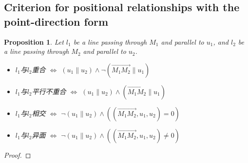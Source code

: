 \documentclass[onecolumn]{ctexart}
\newtheorem{proposition}{Proposition}
\begin{document}
\subsection{Criterion for positional relationships with the point-direction form}
\begin{proposition}
  Let $l_1$ be a line passing through $M_1$ and parallel to $u_1$, and $l_2$ be a line passing through $M_2$ and parallel to $u_2$. 
  \begin{itemize}
    \item $l_1$与$l_2$重合 $\Leftrightarrow$ $(u_1 \parallel u_2) \wedge \neg(\vec{M_1M_2} \parallel u_1)$
    \item $l_1$与$l_2$平行不重合 $\Leftrightarrow$ $(u_1 \parallel u_2) \wedge (\vec{M_1M_2} \parallel u_1)$
    \item $l_1$与$l_2$相交 $\Leftrightarrow$ $\neg(u_1 \parallel u_2) \wedge ((\vec{M_1M_2}, u_1, u_2) = 0)$
    \item $l_1$与$l_2$异面 $\Leftrightarrow$ $\neg(u_1 \parallel u_2) \wedge ((\vec{M_1M_2}, u_1, u_2) \neq 0)$
  \end{itemize}
\end{proposition}
\begin{proof}
  
\end{proof}
\end{document}
